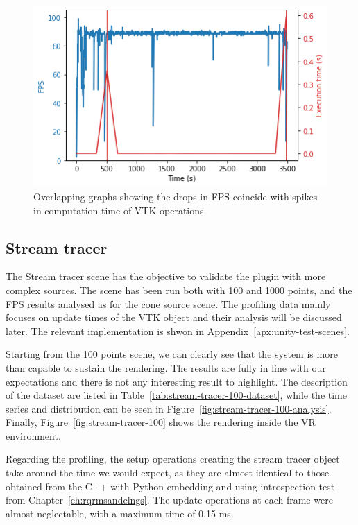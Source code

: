 \begin{figure}[t]
    \centering
    \includegraphics[width=\textwidth]{pictures/analysis cone/output_20_0.png}
    \caption{Overlapping graphs showing the drops in FPS coincide with spikes in computation time of VTK operations.}
    \label{fig:overlapping-cone-source-graphs}
\end{figure}

\subsection{Stream tracer}

The Stream tracer scene has the objective to validate the plugin with more complex sources. The scene has been run both with 100 and 1000 points, and the FPS results analysed as for the cone source scene. The profiling data mainly focuses on update times of the VTK object and their analysis will be discussed later. The relevant implementation is shwon in Appendix~\ref{apx:unity-test-scenes}.

Starting from the 100 points scene, we can clearly see that the system is more than capable to sustain the rendering. The results are fully in line with our expectations and there is not any interesting result to highlight. The description of the dataset are listed in Table~\ref{tab:stream-tracer-100-dataset}, while the time series and distribution can be seen in Figure~\ref{fig:stream-tracer-100-analysis}. Finally, Figure~\ref{fig:stream-tracer-100} shows the rendering inside the VR environment.

Regarding the profiling, the setup operations creating the stream tracer object take around the time we would expect, as they are almost identical to those obtained from the C++ with Python embedding and using introspection test from Chapter~\ref{ch:rqrmsandclngs}. The update operations at each frame were almost neglectable, with a maximum time of 0.15 ms.

